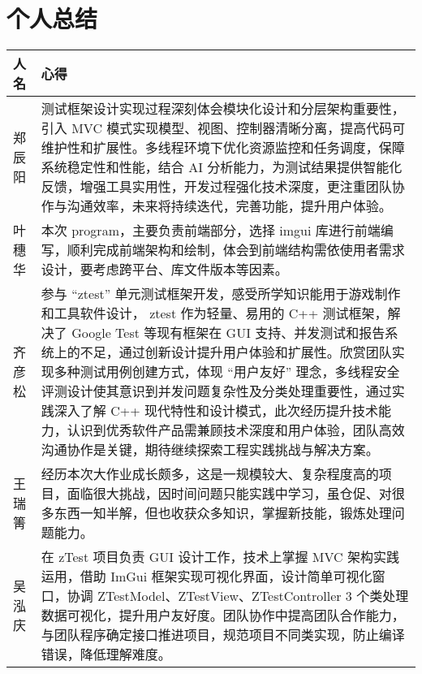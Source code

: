 \documentclass{article}
\begin{document}
\section{个人总结}
\begin{tabular}{|p{50pt}|p{350pt}|}
    \hline
    人名  & 心得                                                                                                                                                                                                                                                                                \\ \hline
    郑辰阳 & 测试框架设计实现过程深刻体会模块化设计和分层架构重要性，引入 MVC 模式实现模型、视图、控制器清晰分离，提高代码可维护性和扩展性。多线程环境下优化资源监控和任务调度，保障系统稳定性和性能，结合 AI 分析能力，为测试结果提供智能化反馈，增强工具实用性，开发过程强化技术深度，更注重团队协作与沟通效率，未来将持续迭代，完善功能，提升用户体验。                                                                                                       \\ \hline
    叶穗华 & 本次 program，主要负责前端部分，选择 imgui 库进行前端编写，顺利完成前端架构和绘制，体会到前端结构需依使用者需求设计，要考虑跨平台、库文件版本等因素。                                                                                                                                                                                                \\ \hline
    齐彦松 & 参与 “ztest” 单元测试框架开发，感受所学知识能用于游戏制作和工具软件设计， ztest 作为轻量、易用的 C++ 测试框架，解决了 Google Test 等现有框架在 GUI 支持、并发测试和报告系统上的不足，通过创新设计提升用户体验和扩展性。欣赏团队实现多种测试用例创建方式，体现 “用户友好” 理念，多线程安全评测设计使其意识到并发问题复杂性及分类处理重要性，通过实践深入了解 C++ 现代特性和设计模式，此次经历提升技术能力，认识到优秀软件产品需兼顾技术深度和用户体验，团队高效沟通协作是关键，期待继续探索工程实践挑战与解决方案。 \\ \hline
    王瑞箐 & 经历本次大作业成长颇多，这是一规模较大、复杂程度高的项目，面临很大挑战，因时间问题只能实践中学习，虽仓促、对很多东西一知半解，但也收获众多知识，掌握新技能，锻炼处理问题能力。                                                                                                                                                                                           \\ \hline
    吴泓庆 & 在 zTest 项目负责 GUI 设计工作，技术上掌握 MVC 架构实践运用，借助 ImGui 框架实现可视化界面，设计简单可视化窗口，协调 ZTestModel、ZTestView、ZTestController 3 个类处理数据可视化，提升用户友好度。团队协作中提高团队合作能力，与团队程序确定接口推进项目，规范项目不同类实现，防止编译错误，降低理解难度。                                                                                              \\ \hline
\end{tabular}
\end{document}

